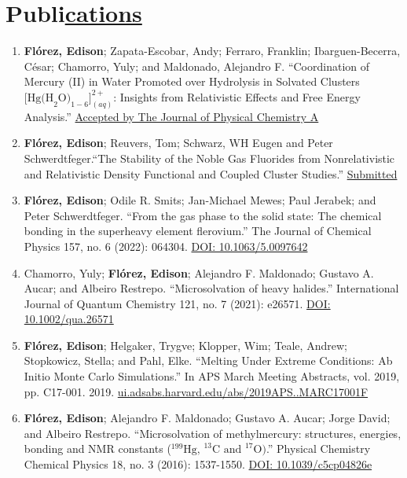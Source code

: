 \section{Publi\href{.}{cations}}

\begin{enumerate}
    \small

    \item \textbf{Flórez, Edison}; Zapata-Escobar, Andy; Ferraro, Franklin; Ibarguen-Becerra, César; Chamorro, Yuly; and Maldonado, Alejandro F. ``Coordination of Mercury (II) in Water Promoted over Hydrolysis in Solvated Clusters $\text{[Hg(H}_2\text{O)}_{1-6}\text{]}^{2+}_{(aq)}$: Insights from Relativistic Effects and Free Energy Analysis.'' \href{.}{Accepted by The Journal of Physical Chemistry A}

    \item \textbf{Flórez, Edison}; Reuvers, Tom; Schwarz, WH Eugen and Peter Schwerdtfeger.``The Stability of the Noble Gas Fluorides from Nonrelativistic and Relativistic Density Functional and Coupled Cluster Studies.'' \href{.}{Submitted}

    \item \textbf{Flórez, Edison}; Odile R. Smits; Jan-Michael Mewes; Paul Jerabek; and Peter Schwerdtfeger. ``From the gas phase to the solid state: The chemical bonding in the superheavy element flerovium.'' The Journal of Chemical Physics 157, no. 6 (2022): 064304. \href{https://www.doi.org/10.1063/5.0097642}{DOI: 10.1063/5.0097642}

    \item Chamorro, Yuly;  \textbf{Flórez, Edison}; Alejandro F. Maldonado; Gustavo A. Aucar; and Albeiro Restrepo. ``Microsolvation of heavy halides.'' International Journal of Quantum Chemistry 121, no. 7 (2021): e26571. \href{https://www.doi.org/10.1002/qua.26571}{DOI: 10.1002/qua.26571}

    \item \textbf{Flórez, Edison}; Helgaker, Trygve; Klopper, Wim; Teale, Andrew; Stopkowicz, Stella; and Pahl, Elke. ``Melting Under Extreme Conditions: Ab Initio Monte Carlo Simulations.'' In APS March Meeting Abstracts, vol. 2019, pp. C17-001. 2019. \href{https://ui.adsabs.harvard.edu/abs/2019APS..MARC17001F/abstract}{ui.adsabs.harvard.edu/abs/2019APS..MARC17001F}

    \item \textbf{Flórez, Edison}; Alejandro F. Maldonado; Gustavo A. Aucar; Jorge David; and Albeiro Restrepo. ``Microsolvation of methylmercury: structures, energies, bonding and NMR constants ($^{199}\text{Hg, }^{13}\text{C and }^{17}\text{O)}$.'' Physical Chemistry Chemical Physics 18, no. 3 (2016): 1537-1550. \href{https://www.doi.org/10.1039/c5cp04826e}{DOI: 10.1039/c5cp04826e}

\end{enumerate}


